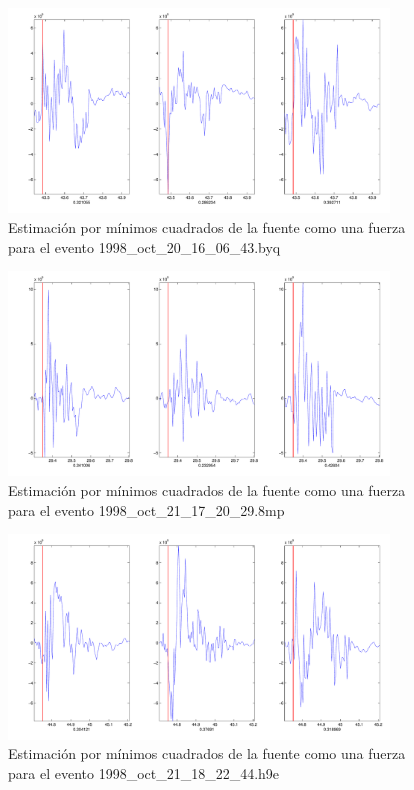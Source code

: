 \begin{figure}[H]
\includegraphics[width=0.9\textwidth,height=0.4\textheight]{linea_timerev/figuras/plotSrcEv19src.pdf}
\caption{Estimación por mínimos cuadrados de la fuente como una fuerza para el
evento 1998\_oct\_20\_16\_06\_43.byq}
\end{figure}
\begin{figure}[H]
\includegraphics[width=0.9\textwidth,height=0.4\textheight]{linea_timerev/figuras/plotSrcEv20src.pdf}
\caption{Estimación por mínimos cuadrados de la fuente como una fuerza para el
evento 1998\_oct\_21\_17\_20\_29.8mp}
\end{figure}
\begin{figure}[H]
\includegraphics[width=0.9\textwidth,height=0.4\textheight]{linea_timerev/figuras/plotSrcEv21src.pdf}
\caption{Estimación por mínimos cuadrados de la fuente como una fuerza para el
evento 1998\_oct\_21\_18\_22\_44.h9e}
\end{figure}

